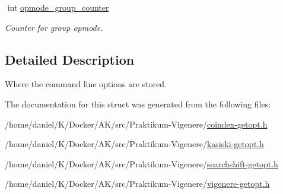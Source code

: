 \begin{DoxyCompactItemize}
$$\mbox{\label{structgengetopt__args__info_a44f277219c706b8ca8b64ce3d9f3f2ec}} 
int \hyperlink{structgengetopt__args__info_a44f277219c706b8ca8b64ce3d9f3f2ec}{opmode\+\_\+group\+\_\+counter}
\begin{DoxyCompactList}\small\item\em Counter for group opmode. \end{DoxyCompactList}\end{DoxyCompactItemize}


\subsection{Detailed Description}
Where the command line options are stored. 

The documentation for this struct was generated from the following files\+:\begin{DoxyCompactItemize}
\item 
/home/daniel/\+K/\+Docker/\+A\+K/src/\+Praktikum-\/\+Vigenere/\hyperlink{coindex-getopt_8h}{coindex-\/getopt.\+h}\item 
/home/daniel/\+K/\+Docker/\+A\+K/src/\+Praktikum-\/\+Vigenere/\hyperlink{kasiski-getopt_8h}{kasiski-\/getopt.\+h}\item 
/home/daniel/\+K/\+Docker/\+A\+K/src/\+Praktikum-\/\+Vigenere/\hyperlink{searchshift-getopt_8h}{searchshift-\/getopt.\+h}\item 
/home/daniel/\+K/\+Docker/\+A\+K/src/\+Praktikum-\/\+Vigenere/\hyperlink{vigenere-getopt_8h}{vigenere-\/getopt.\+h}\end{DoxyCompactItemize}
